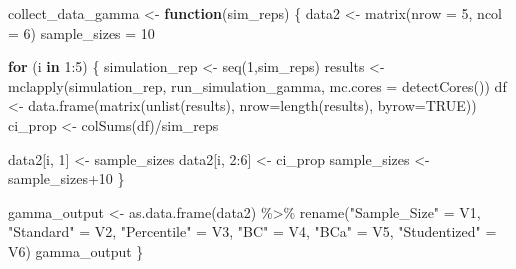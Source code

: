 \documentclass[12pt]{article}
\newenvironment{Shaded}{\begin{snugshade}}{\end{snugshade}}
\newcommand{\AttributeTok}[1]{\textcolor[rgb]{0.77,0.63,0.00}{#1}}
\newcommand{\ConstantTok}[1]{\textcolor[rgb]{0.00,0.00,0.00}{#1}}
\newcommand{\ControlFlowTok}[1]{\textcolor[rgb]{0.13,0.29,0.53}{\textbf{#1}}}
\newcommand{\DecValTok}[1]{\textcolor[rgb]{0.00,0.00,0.81}{#1}}
\newcommand{\FunctionTok}[1]{\textcolor[rgb]{0.00,0.00,0.00}{#1}}
\newcommand{\NormalTok}[1]{#1}
\newcommand{\OtherTok}[1]{\textcolor[rgb]{0.56,0.35,0.01}{#1}}
\newcommand{\SpecialCharTok}[1]{\textcolor[rgb]{0.00,0.00,0.00}{#1}}
\newcommand{\StringTok}[1]{\textcolor[rgb]{0.31,0.60,0.02}{#1}}
\begin{document}
\begin{Shaded}
\begin{Highlighting}[]
\NormalTok{collect\_data\_gamma }\OtherTok{\textless{}{-}} \ControlFlowTok{function}\NormalTok{(sim\_reps) \{}
\NormalTok{  data2 }\OtherTok{\textless{}{-}} \FunctionTok{matrix}\NormalTok{(}\AttributeTok{nrow =} \DecValTok{5}\NormalTok{, }\AttributeTok{ncol =} \DecValTok{6}\NormalTok{)}
\NormalTok{  sample\_sizes }\OtherTok{=} \DecValTok{10}

  \ControlFlowTok{for}\NormalTok{ (i }\ControlFlowTok{in} \DecValTok{1}\SpecialCharTok{:}\DecValTok{5}\NormalTok{) \{}
\NormalTok{    simulation\_rep }\OtherTok{\textless{}{-}} \FunctionTok{seq}\NormalTok{(}\DecValTok{1}\NormalTok{,sim\_reps)}
\NormalTok{    results }\OtherTok{\textless{}{-}} \FunctionTok{mclapply}\NormalTok{(simulation\_rep, run\_simulation\_gamma, }
                        \AttributeTok{mc.cores =} \FunctionTok{detectCores}\NormalTok{())}
\NormalTok{    df }\OtherTok{\textless{}{-}} \FunctionTok{data.frame}\NormalTok{(}\FunctionTok{matrix}\NormalTok{(}\FunctionTok{unlist}\NormalTok{(results), }\AttributeTok{nrow=}\FunctionTok{length}\NormalTok{(results), }\AttributeTok{byrow=}\ConstantTok{TRUE}\NormalTok{))}
\NormalTok{    ci\_prop }\OtherTok{\textless{}{-}} \FunctionTok{colSums}\NormalTok{(df)}\SpecialCharTok{/}\NormalTok{sim\_reps}

\NormalTok{    data2[i, }\DecValTok{1}\NormalTok{] }\OtherTok{\textless{}{-}}\NormalTok{ sample\_sizes}
\NormalTok{    data2[i, }\DecValTok{2}\SpecialCharTok{:}\DecValTok{6}\NormalTok{] }\OtherTok{\textless{}{-}}\NormalTok{ ci\_prop}
\NormalTok{    sample\_sizes }\OtherTok{\textless{}{-}}\NormalTok{ sample\_sizes}\SpecialCharTok{+}\DecValTok{10}
\NormalTok{  \}}

\NormalTok{  gamma\_output }\OtherTok{\textless{}{-}} \FunctionTok{as.data.frame}\NormalTok{(data2) }\SpecialCharTok{\%\textgreater{}\%} 
    \FunctionTok{rename}\NormalTok{(}\StringTok{"Sample\_Size"} \OtherTok{=}\NormalTok{ V1, }\StringTok{"Standard"} \OtherTok{=}\NormalTok{ V2, }\StringTok{"Percentile"} \OtherTok{=}\NormalTok{ V3, }\StringTok{"BC"} \OtherTok{=}\NormalTok{ V4, }
           \StringTok{"BCa"} \OtherTok{=}\NormalTok{ V5, }\StringTok{"Studentized"} \OtherTok{=}\NormalTok{ V6) }
\NormalTok{  gamma\_output}
\NormalTok{\}}
\end{Highlighting}
\end{Shaded}
\end{document}
